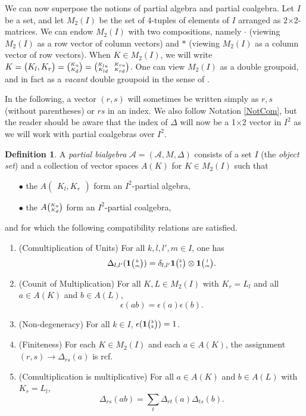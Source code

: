 \documentclass[10pt]{article}
\newcommand{\Grs}[3]{#1{\begin{pmatrix} #2,  #3\end{pmatrix}}}
\newcommand{\Grt}[3]{#1{\tiny {\begin{pmatrix} #2\\#3\end{pmatrix}}}}
\newcommand{\UnitC}[2]{\Grt{\mathbf{1}}{#1}{#2}}
\newcommand{\eGr}[5]{#1{{\tiny \begin{pmatrix} #2 \quad #3 \\ #4 \quad #5\end{pmatrix}}}}
\theoremstyle{definition}
\newtheorem{Def}[Theorem]{Definition}
\numberwithin{equation}{section}
\begin{document}
We can now superpose the notions of partial algebra and partial coalgebra. Let $I$ be a set, and let $M_2(I)$ be the set of 4-tuples of elements of $I$ arranged as 2$\times$2-matrices. We can endow $M_2(I)$ with two compositions, namely $\cdot$ (viewing $M_2(I)$ as a row vector of column vectors) and $*$ (viewing $M_2(I)$ as a column vector of row vectors). When $K\in M_2(I)$, we will write $K = \Grs{}{K_l}{K_r} = \Grt{}{K_u}{K_d} = \eGr{}{K_{lu}}{K_{ru}}{K_{ld}}{K_{rd}}$. One can view $M_2(I)$ as a double groupoid, and in fact as a \emph{vacant} double groupoid in the sense of \cite{AN1}. 

In the following, a vector $(r,s)$ will sometimes be written simply as $r,s$ (without parentheses) or $rs$ in an index. We also follow Notation \ref{NotCom}, but the reader should be aware that the index of $\Delta$ will now be a 1$\times$2 vector in $I^2$ as we will work with partial coalgebras over $I^2$.

\begin{Def}\label{DefPartBiAlg} A \emph{partial bialgebra} $\mathscr{A}=(\mathscr{A},M,\Delta)$ consists of a set $I$ (the \emph{object set}) and a collection of vector spaces $A(K)$ for $K\in M_2(I)$ such that 
\begin{itemize}
\item[$\bullet$] the $\Grs{A}{K_l}{K_r}$ form an $I^2$-partial algebra,
\item[$\bullet$] the $\Grt{A}{K_u}{K_d}$ form an $I^2$-partial coalgebra,
\end{itemize} 
and for which the following compatibility relations are satisfied.
\begin{enumerate}[label=(\arabic*)]
\item\label{Propa} (Comultiplication of Units) For all $k,l,l',m\in I$, one has 
\[\Delta_{l,l'}(\UnitC{k}{m}) = \delta_{l,l'} \UnitC{k}{l}\otimes \UnitC{l}{m}.\]  
\item\label{Propb} (Counit of Multiplication) For all $K,L\in M_2(I)$ with $K_r = L_l$ and all $a\in A(K)$ and $b\in A(L)$, \[\epsilon(ab) = \epsilon(a)\epsilon(b).\]%
\item\label{Propc} (Non-degeneracy) For all $k\in I$, $\epsilon(\UnitC{k}{k})=1$. 
\item\label{Propd} (Finiteness) For each $K\in M_2(I)$ and each $a\in A(K)$, the assignment $(r,s)\rightarrow \Delta_{rs}(a)$ is rcf.
\item\label{Prope} (Comultiplication is multiplicative) For all $a\in A(K)$ and $b\in A(L)$ with $K_r= L_l$,  \[\Delta_{rs}(ab) = \sum_t \Delta_{rt}(a)\Delta_{ts}(b).\]
\end{enumerate}
\end{Def}
\end{document}
